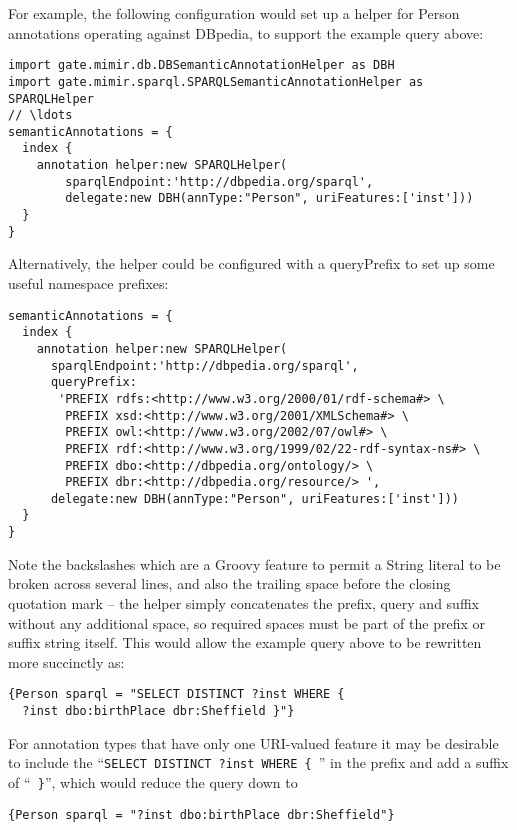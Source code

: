 For example, the following configuration would set up a helper for Person
annotations operating against DBpedia, to support the example query above:
\begin{lstlisting}[texcl, breaklines, breakindent=150pt]
import gate.mimir.db.DBSemanticAnnotationHelper as DBH
import gate.mimir.sparql.SPARQLSemanticAnnotationHelper as SPARQLHelper
// \ldots
semanticAnnotations = {
  index {
    annotation helper:new SPARQLHelper(
        sparqlEndpoint:'http://dbpedia.org/sparql',
        delegate:new DBH(annType:"Person", uriFeatures:['inst']))
  }
}
\end{lstlisting}

Alternatively, the helper could be configured with a queryPrefix to set up some
useful namespace prefixes:
\begin{lstlisting}[texcl, breaklines, breakindent=150pt]
semanticAnnotations = {
  index {
    annotation helper:new SPARQLHelper(
      sparqlEndpoint:'http://dbpedia.org/sparql',
      queryPrefix:
       'PREFIX rdfs:<http://www.w3.org/2000/01/rdf-schema#> \
        PREFIX xsd:<http://www.w3.org/2001/XMLSchema#> \
        PREFIX owl:<http://www.w3.org/2002/07/owl#> \
        PREFIX rdf:<http://www.w3.org/1999/02/22-rdf-syntax-ns#> \
        PREFIX dbo:<http://dbpedia.org/ontology/> \
        PREFIX dbr:<http://dbpedia.org/resource/> ',
      delegate:new DBH(annType:"Person", uriFeatures:['inst']))
  }
}
\end{lstlisting}

Note the backslashes which are a Groovy feature to permit a String literal to
be broken across several lines, and also the trailing space before the closing
quotation mark -- the helper simply concatenates the prefix, query and suffix
without any additional space, so required spaces must be part of the prefix or
suffix string itself.  This would allow the example query above to be rewritten
more succinctly as:
\begin{verbatim}
{Person sparql = "SELECT DISTINCT ?inst WHERE {
  ?inst dbo:birthPlace dbr:Sheffield }"}
\end{verbatim}

For annotation types that have only one URI-valued feature it may be desirable
to include the ``\verb!SELECT DISTINCT ?inst WHERE { !'' in the prefix and add
a suffix of ``\verb! }!'', which would reduce the query down to
\begin{verbatim}
{Person sparql = "?inst dbo:birthPlace dbr:Sheffield"}
\end{verbatim}

